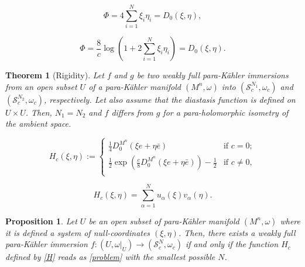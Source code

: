 \documentclass[10pt,a4paper]{amsart}
\newtheorem{thm}{Theorem}
\newtheorem{prop}{Proposition}
\newcommand{\pk}{para-K\"ahler }
\newcommand{\s}{\mathcal{S}}
\begin{document}
\begin{equation}\label{dn}
 \Phi=4\sum_{i=1}^N \xi_i\eta_i =D_0(\xi,\eta), \end{equation}

\begin{equation}\label{dpn}
\Phi= \frac{8}{c}\log\left( 1+2\sum_{i=1}^N \xi_i\eta_i\right)=D_0(\xi,\eta). \end{equation}

\begin{thm}[Rigidity]\label{rigidity}
Let $f$ and $g$ be  two weakly full \pk immersions from an open subset $U$ of a \pk manifold $(M^n,\omega)$ into $(\s_c^{N_1},\omega_c)$ and  $(\s_c^{N_2},\omega_c)$, respectively. Let also assume that
the diastasis function is defined on $U\times U$.  Then,  $N_1=N_2$ and 
$f$ differs from $g$ for a para-holomorphic isometry of the ambient space.
\end{thm}

\begin{equation}\label{H}
H_c(\xi,\eta):=
\begin{cases}
\frac{1}{4}D_0^{M^n}(\xi e+\eta \bar e)&\text{if } c=0;\\
\frac{1}{2}\exp\left( \frac{c}{8}D_0^{M^n}(\xi e+\eta \bar e)\right)-\frac{1}{2} &\text{if } c\neq 0,\\
\end{cases}
\end{equation}

\begin{equation}\label{problem}
H_c(\xi,\eta)=\sum_{\alpha=1}^N u_\alpha(\xi)v_\alpha(\eta).
\end{equation}

\begin{prop}\label{existence}
Let $U$ be an open subset of \pk manifold $(M^n,\omega)$ where it is defined a system of null-coordinates $(\xi,\eta)$. Then, there exists a weakly full \pk immersion
 $f: (U,\omega|_U)\to (\s_c^N,\omega_c)$
if and only if the function $H_c$ defined by \eqref{H} reads as \eqref{problem} with the smallest possible $N$. 
\end{prop}
\end{document}
